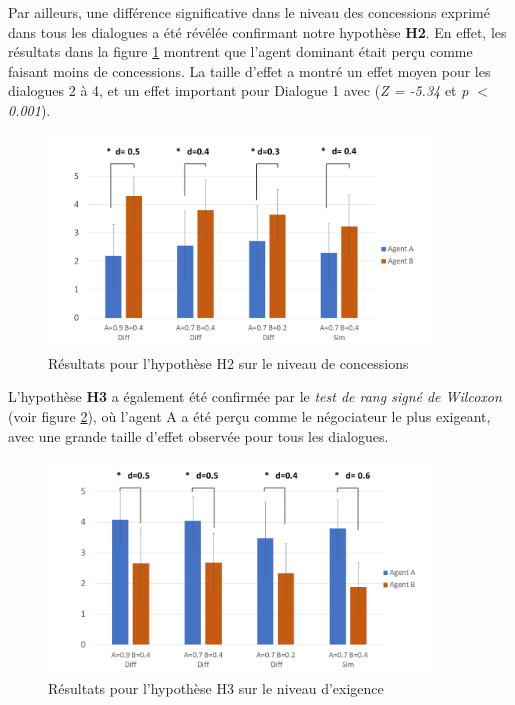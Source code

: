 {			\par Par ailleurs, une différence significative dans le niveau des concessions exprimé dans tous les dialogues a été révélée confirmant notre hypothèse \textbf {H2}. En effet, les résultats dans la figure \ref{fig:H2} montrent que l'agent dominant était perçu comme faisant moins de concessions. La taille d'effet a montré un effet moyen pour les dialogues 2 à 4, et un effet important pour Dialogue 1 avec (\emph {Z = -5.34} et \emph {p $ <$ 0.001}).
			
			\begin{figure}[h]
				\includegraphics[width=0.9\textwidth, height= 0.25 \textheight]{Figures/chap4/AA/graphs/Diapositive2.PNG}
				\caption{Résultats pour l'hypothèse H2 sur le niveau de concessions \label{fig:H2}}
			\end{figure}
			
			\par L'hypothèse \textbf {H3} a également été confirmée par le \emph {test de rang signé de Wilcoxon} (voir figure \ref{fig:H3}), où l'agent A a été perçu comme le négociateur le plus exigeant, avec une grande taille d'effet observée pour tous les dialogues. 
			\begin{figure}[h]
				\includegraphics[width=0.9\textwidth, height= 0.25 \textheight]{Figures/chap4/AA/graphs/Diapositive3.PNG}
				\caption{Résultats pour l'hypothèse H3 sur le niveau d'exigence\label{fig:H3}}
			\end{figure}
			
}
